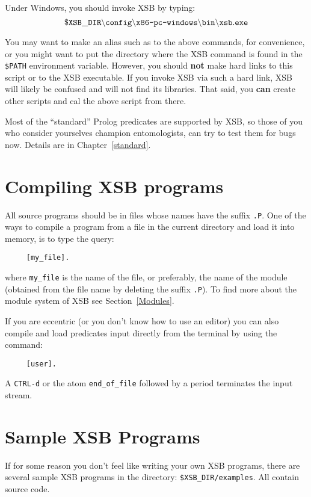 Under Windows, you should invoke XSB by typing:
\[
 \tt
 \$XSB\_DIR\backslash config\backslash \mbox{\tt x86-pc-windows}\backslash bin
 \backslash xsb.exe
\]


You may want to make an alias such as {\tt \smallourprolog} to the above
commands, for convenience, or you might want to put the directory where the
XSB command is found in the {\tt \$PATH} environment variable. However, you
should {\bf not} make hard links to this script or to the XSB executable.
If you invoke XSB via such a hard link, XSB will likely be confused and will
not find its libraries.  That said, you {\bf can} create other scripts and
cal the above script from there.

Most of the ``standard'' Prolog predicates are supported by XSB, 
so those of you who consider yourselves champion entomologists, can try
to test them for bugs now.  Details are in Chapter~\ref{standard}.


\section{Compiling XSB programs}

All source programs should be in files whose names have the 
suffix {\tt .P}.  One of the ways to compile a program from a file in 
the current directory and load it into memory, is to type the query:
\begin{verbatim}
     [my_file].
\end{verbatim}
where \verb'my_file' is the name of the file, or preferably, the name
of the module (obtained from the file name by deleting the suffix {\tt .P}).
To find more about the module system of XSB see Section~\ref{Modules}.

If you are eccentric (or you don't know how to use an editor) you can also 
compile and load predicates input directly from the terminal by using the
command:
\begin{verbatim}
     [user].
\end{verbatim}
A {\tt CTRL-d} or the atom \verb'end_of_file' followed by a period 
terminates the input stream.


\section{Sample XSB Programs}

If for some reason you don't feel like writing your own XSB programs, 
there are several sample XSB programs in the directory: 
\verb'$XSB_DIR/examples'.  All contain source code.

